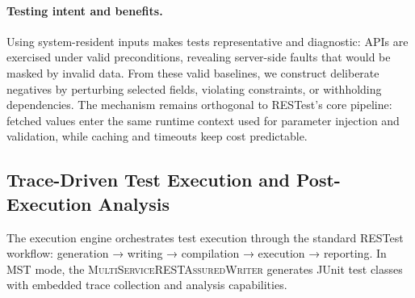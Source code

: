 \documentclass[conference]{IEEEtran}
\begin{document}
\paragraph{Testing intent and benefits.}
Using system-resident inputs makes tests representative and diagnostic: APIs are exercised under valid preconditions, revealing server-side faults that would be masked by invalid data. From these valid baselines, we construct deliberate negatives by perturbing selected fields, violating constraints, or withholding dependencies. The mechanism remains orthogonal to RESTest’s core pipeline: fetched values enter the same runtime context used for parameter injection and validation, while caching and timeouts keep cost predictable.


\subsection{Trace-Driven Test Execution and Post-Execution Analysis}
\label{ssec:exec}

The execution engine orchestrates test execution through the standard RESTest workflow: generation → writing → compilation → execution → reporting. In MST mode, the \textsc{MultiServiceRESTAssuredWriter} generates JUnit test classes with embedded trace collection and analysis capabilities.
\end{document}
